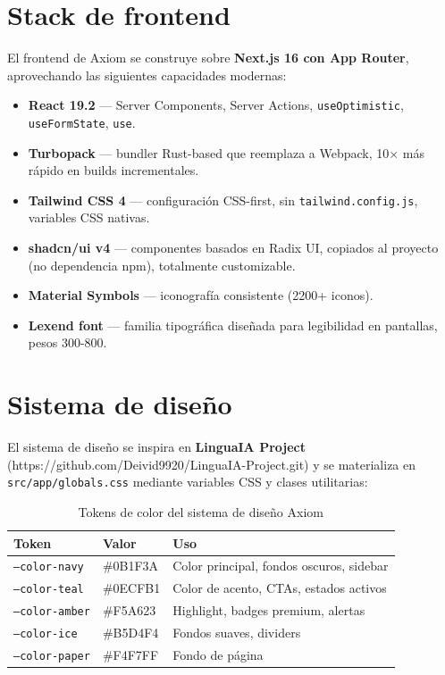 \documentclass[10pt,a4paper,oneside]{report}
\begin{document}
\section{Stack de frontend}
El frontend de Axiom se construye sobre \textbf{Next.js 16 con App Router}, aprovechando las siguientes capacidades modernas:

\begin{itemize}[leftmargin=1.4em]
\item \textbf{React 19.2} — Server Components, Server Actions, \texttt{useOptimistic}, \texttt{useFormState}, \texttt{use}.
\item \textbf{Turbopack} — bundler Rust-based que reemplaza a Webpack, 10× más rápido en builds incrementales.
\item \textbf{Tailwind CSS 4} — configuración CSS-first, sin \texttt{tailwind.config.js}, variables CSS nativas.
\item \textbf{shadcn/ui v4} — componentes basados en Radix UI, copiados al proyecto (no dependencia npm), totalmente customizable.
\item \textbf{Material Symbols} — iconografía consistente (2200+ iconos).
\item \textbf{Lexend font} — familia tipográfica diseñada para legibilidad en pantallas, pesos 300-800.
\end{itemize}

\section{Sistema de diseño}
El sistema de diseño se inspira en \textbf{LinguaIA Project} (https://github.com/Deivid9920/LinguaIA-Project.git) y se materializa en \texttt{src/app/globals.css} mediante variables CSS y clases utilitarias:

\begin{table}[H]
\centering
\begin{tabular}{p{2.5cm}p{2.5cm}p{6.5cm}}
\toprule
\textbf{Token} & \textbf{Valor} & \textbf{Uso} \\
\midrule
\texttt{--color-navy} & \#0B1F3A & Color principal, fondos oscuros, sidebar \\
\texttt{--color-teal} & \#0ECFB1 & Color de acento, CTAs, estados activos \\
\texttt{--color-amber} & \#F5A623 & Highlight, badges premium, alertas \\
\texttt{--color-ice} & \#B5D4F4 & Fondos suaves, dividers \\
\texttt{--color-paper} & \#F4F7FF & Fondo de página \\
\bottomrule
\end{tabular}
\caption{Tokens de color del sistema de diseño Axiom}
\end{table}
\end{document}
